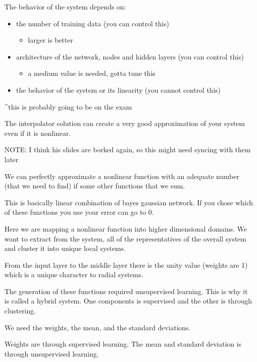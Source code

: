 \documentclass{article}
\begin{document}
The behavior of the system depends on:
\begin{itemize}
	\item the number of training data (you can control this)
	\begin{itemize}
		\item larger is better
	\end{itemize}
	\item architecture of the network, nodes and hidden layers (you can control this)
	\begin{itemize}
		\item a medium value is needed, gotta tune this
	\end{itemize}
	\item the behavior of the system or its linearity (you cannot control this)
\end{itemize}
^this is probably going to be on the exam

The interpolator solution can create a very good approximation of your system even if it is nonlinear.

NOTE: I think his slides are borked again, so this might need syncing with them later

We can perfectly approximate a nonlinear function with an adequate number (that we need to find) if some other functions that we sum.

This is basically linear combination of bayes gaussian network. If you chose which of these functions you use your error can go to 0.


Here we are mapping a nonlinear function into higher dimensional domains. We want to extract from the system, all of the representatives of the overall system and cluster it into unique local systems.


From the input layer to the middle layer there is the unity value (weights are 1) which is a unique character to radial systems.



The generation of these functions required unsupervised learning. This is why it is called a hybrid system. One components is supervised and the other is through clustering.

We need the weights, the mean, and the standard deviations.

Weights are through supervised learning. The mean and standard deviation is through unsupervised learning.


\end{document}
